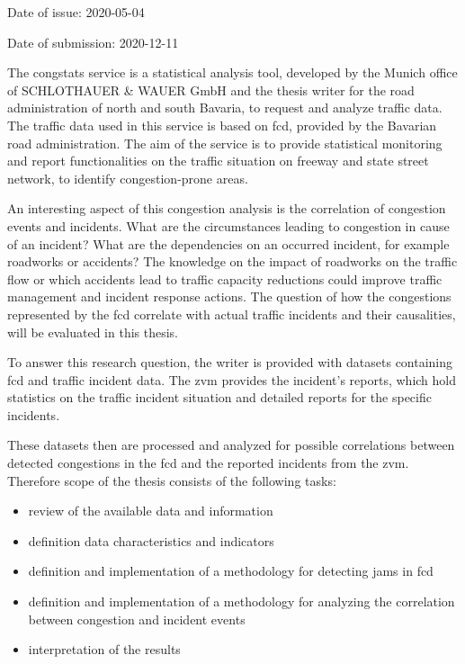 \documentclass[a4paper,headsepline,footsepline,fontsize=11pt,BCOR=12mm,DIV=12]{report}
\begin{document}
\clearpage

\renewcommand\abstractname{Topic}
\abstract{}
\par Date of issue: 2020-05-04  
\par Date of submission:	2020-12-11

\medskip

The \gls{congstats} service is a statistical analysis tool, developed by the Munich office of SCHLOTHAUER \& WAUER GmbH and the thesis writer for the road administration of north and south Bavaria, to request and analyze traffic data. The traffic data used in this service is based on \acrfull{fcd}, provided by the Bavarian road administration. The aim of the service is to provide statistical monitoring and report functionalities on the traffic situation on freeway and state street network, to identify congestion-prone areas.

An interesting aspect of this congestion analysis is the correlation of congestion events and incidents. What are the circumstances leading to congestion in cause of an incident? What are the dependencies on an occurred incident, for example roadworks or accidents? The knowledge on the impact of roadworks on the traffic flow or which accidents lead to traffic capacity reductions could improve traffic management and incident response actions. The question of how the congestions represented by the \acrshort{fcd} correlate with actual traffic incidents and their causalities, will be evaluated in this thesis. 

To answer this research question, the writer is provided with datasets containing \acrshort{fcd} and traffic incident data. The \acrfull{zvm} provides the incident’s reports, which hold statistics on the traffic incident situation and detailed reports for the specific incidents.

These datasets then are processed and analyzed for possible correlations between detected congestions in the \acrshort{fcd} and the reported incidents from the \acrshort{zvm}. Therefore scope of the thesis consists of the following tasks:

\begin{itemize}
  \item review of the available data and information
  \item definition data characteristics and indicators
  \item definition and implementation of a methodology for detecting jams in \acrshort{fcd}
  \item definition and implementation of a methodology for analyzing the correlation between congestion and incident events
  \item interpretation of the results
\end{itemize}
\end{document}
